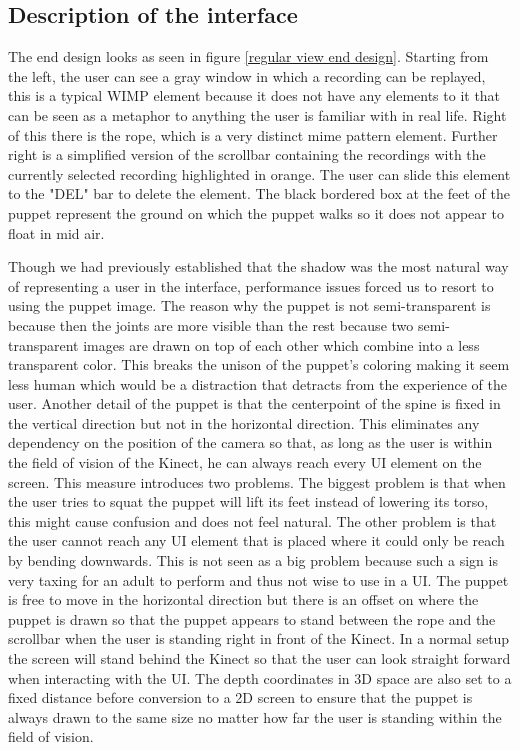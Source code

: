 
\subsection{Description of the interface}

The end design looks as seen in figure \ref{regular view end design}. Starting from the left, the user can see a gray window in which a recording can be replayed, this is a typical WIMP element because it does not have any elements to it that can be seen as a metaphor to anything the user is familiar with in real life. Right of this there is the rope, which is a very distinct mime pattern element. Further right is a simplified version of the scrollbar containing the recordings with the currently selected recording highlighted in orange. The user can slide this element to the "DEL" bar to delete the element. The black bordered box at the feet of the puppet represent the ground on which the puppet walks so it does not appear to float in mid air.

Though we had previously established that the shadow was the most natural way of representing a user in the interface, performance issues forced us to resort to using the puppet image. The reason why the puppet is not semi-transparent is because then the joints are  more visible than the rest because two semi-transparent images are drawn on top of each other which combine into a less transparent color. This breaks the unison of the puppet's coloring making it seem less human which would be a distraction that detracts from the experience of the user. Another detail of the puppet is that the centerpoint of the spine is fixed in the vertical direction but not in the horizontal direction. This eliminates any dependency on the position of the camera so that, as long as the user is within the field of vision of the Kinect, he can always reach every UI element on the screen. This measure introduces two  problems. The biggest problem is that when the user tries to squat the puppet will lift its feet instead of lowering its torso, this might cause confusion and does not feel natural. The other problem is that the user cannot reach any UI element that is placed where it could only be reach by bending downwards. This is not seen as a big problem because such a sign is very taxing for an adult to perform and thus not wise to use in a UI. The puppet is free to move in the horizontal direction but there is an offset on where the puppet is drawn so that the puppet appears to stand between the rope and the scrollbar when the user is standing right in front of the Kinect. In a normal setup the screen will stand behind the Kinect so that the user can look straight forward when interacting with the UI. The depth coordinates in 3D space are also set to a fixed distance before conversion to a 2D screen to ensure that the puppet is always drawn to the same size no matter how far the user is standing within the field of vision.\\


